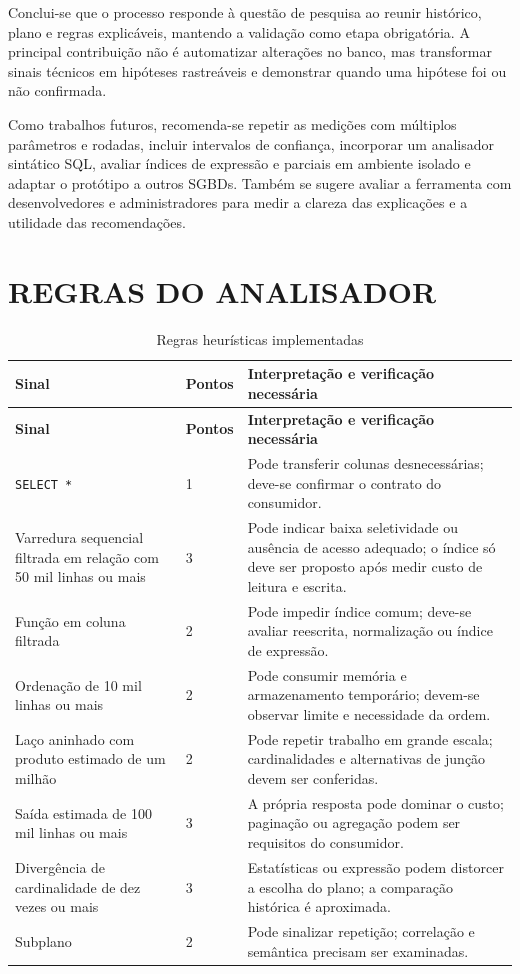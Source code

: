 \documentclass{UNESC}
\newcommand{\codigo}[1]{\texttt{#1}}
\begin{document}
Conclui-se que o processo responde à questão de pesquisa ao reunir histórico, plano e regras explicáveis, mantendo a validação como etapa obrigatória. A principal contribuição não é automatizar alterações no banco, mas transformar sinais técnicos em hipóteses rastreáveis e demonstrar quando uma hipótese foi ou não confirmada.

Como trabalhos futuros, recomenda-se repetir as medições com múltiplos parâmetros e rodadas, incluir intervalos de confiança, incorporar um analisador sintático SQL, avaliar índices de expressão e parciais em ambiente isolado e adaptar o protótipo a outros SGBDs. Também se sugere avaliar a ferramenta com desenvolvedores e administradores para medir a clareza das explicações e a utilidade das recomendações.

\appendix
\section{REGRAS DO ANALISADOR}

\begin{longtable}{p{4.0cm} p{1.5cm} p{8.0cm}}
\caption{Regras heurísticas implementadas}\label{tab:regras}\\
\toprule
\textbf{Sinal} & \textbf{Pontos} & \textbf{Interpretação e verificação necessária}\\
\midrule
\endfirsthead
\toprule
\textbf{Sinal} & \textbf{Pontos} & \textbf{Interpretação e verificação necessária}\\
\midrule
\endhead
\codigo{SELECT *} & 1 & Pode transferir colunas desnecessárias; deve-se confirmar o contrato do consumidor.\\
Varredura sequencial filtrada em relação com 50 mil linhas ou mais & 3 & Pode indicar baixa seletividade ou ausência de acesso adequado; o índice só deve ser proposto após medir custo de leitura e escrita.\\
Função em coluna filtrada & 2 & Pode impedir índice comum; deve-se avaliar reescrita, normalização ou índice de expressão.\\
Ordenação de 10 mil linhas ou mais & 2 & Pode consumir memória e armazenamento temporário; devem-se observar limite e necessidade da ordem.\\
Laço aninhado com produto estimado de um milhão & 2 & Pode repetir trabalho em grande escala; cardinalidades e alternativas de junção devem ser conferidas.\\
Saída estimada de 100 mil linhas ou mais & 3 & A própria resposta pode dominar o custo; paginação ou agregação podem ser requisitos do consumidor.\\
Divergência de cardinalidade de dez vezes ou mais & 3 & Estatísticas ou expressão podem distorcer a escolha do plano; a comparação histórica é aproximada.\\
Subplano & 2 & Pode sinalizar repetição; correlação e semântica precisam ser examinadas.\\
\bottomrule
\end{longtable}
\end{document}

